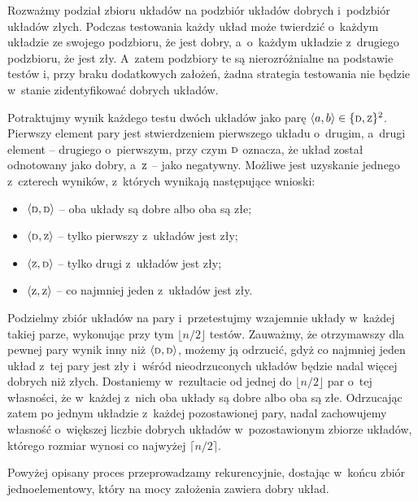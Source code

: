 
\subproblem %
Rozważmy podział zbioru układów na podzbiór układów dobrych i~podzbiór układów złych.
Podczas testowania każdy układ może twierdzić o~każdym układzie ze swojego podzbioru, że jest dobry, a~o~każdym układzie z~drugiego podzbioru, że jest zły.
A~zatem podzbiory te są nierozróżnialne na podstawie testów i, przy braku dodatkowych założeń, żadna strategia testowania nie będzie w~stanie zidentyfikować dobrych układów.

\subproblem %
Potraktujmy wynik każdego testu dwóch układów jako parę $\langle a,b\rangle\in\{{\scriptstyle\rm D},{\scriptstyle\rm Z}\}^2$.
Pierwszy element pary jest stwierdzeniem pierwszego układu o~drugim, a~drugi element -- drugiego o~pierwszym, przy czym ${\scriptstyle\rm D}$ oznacza, że układ został odnotowany jako dobry, a~${\scriptstyle\rm Z}$ -- jako negatywny.
Możliwe jest uzyskanie jednego z~czterech wyników, z~których wynikają następujące wnioski:
\begin{itemize}
	\item $\langle{\scriptstyle\rm D},{\scriptstyle\rm D}\rangle$ -- oba układy są dobre albo oba są złe;
	\item $\langle{\scriptstyle\rm D},{\scriptstyle\rm Z}\rangle$ -- tylko pierwszy z~układów jest zły;
	\item $\langle{\scriptstyle\rm Z},{\scriptstyle\rm D}\rangle$ -- tylko drugi z~układów jest zły;
	\item $\langle{\scriptstyle\rm Z},{\scriptstyle\rm Z}\rangle$ -- co najmniej jeden z~układów jest zły.
\end{itemize}

Podzielmy zbiór układów na pary i~przetestujmy wzajemnie układy w~każdej takiej parze, wykonując przy tym $\lfloor n/2\rfloor$ testów.
Zauważmy, że otrzymawszy dla pewnej pary wynik inny niż $\langle{\scriptstyle\rm D},{\scriptstyle\rm D}\rangle$, możemy ją odrzucić, gdyż co najmniej jeden układ z~tej pary jest zły i~wśród nieodrzuconych układów będzie nadal więcej dobrych niż złych.
Dostaniemy w~rezultacie od jednej do $\lfloor n/2\rfloor$ par o~tej własności, że w~każdej z~nich oba układy są dobre albo oba są złe.
Odrzucając zatem po jednym układzie z~każdej pozostawionej pary, nadal zachowujemy własność o~większej liczbie dobrych układów w~pozostawionym zbiorze układów, którego rozmiar wynosi co najwyżej $\lceil n/2\rceil$.

Powyżej opisany proces przeprowadzamy rekurencyjnie, dostając w~końcu zbiór jednoelementowy, który na mocy założenia zawiera dobry układ.

